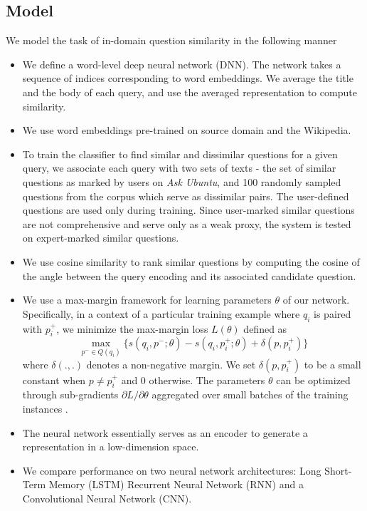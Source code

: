 \documentclass{sigkddExp}
\begin{document}
\subsection{Model}
We model the task of in-domain question similarity in the following manner
\begin{itemize}[topsep=0pt,itemsep=-1ex,partopsep=1ex,parsep=1ex]
  \item We define a word-level deep neural network (DNN). The network takes a sequence of indices corresponding to word embeddings. We average the title and the body of each query, and use the averaged representation to compute similarity.
  \item We use word embeddings pre-trained on source domain and the Wikipedia.
  \item To train the classifier to find similar and dissimilar questions for a given query, we associate each query with two sets of texts - the set of similar questions as marked by users on \textit{Ask Ubuntu}, and 100 randomly sampled questions from the corpus which serve as dissimilar pairs. The user-defined questions are used only during training. Since user-marked similar questions are not comprehensive and serve only as a weak proxy, the system is tested on expert-marked similar questions.
  \item We use cosine similarity to rank similar questions by computing the cosine of the angle between the query encoding and its associated candidate question.
  \item We use a max-margin framework for learning parameters $\theta$ of our network. Specifically, in a context of a particular training example where $q_i$ is paired with $p^+_i$, we minimize the max-margin loss $L(\theta)$ defined as\\
  \begin{equation}
  \max_{p^- \in Q(q_i)} \{s(q_i,p^-;\theta) - s(q_i,p^+_i;\theta) + \delta(p, p^+_i)\}
  \end{equation}
where $\delta(.,.)$ denotes a non-negative margin. We set $\delta(p, p^+_i)$ to be a small constant when $p \neq p^+_i$ and 0 otherwise. The parameters $\theta$ can be optimized through sub-gradients ${\partial L}/{\partial \theta}$ aggregated over small batches of the training instances \cite{lei2015semi}.
  \item The neural network essentially serves as an encoder to generate a representation in a low-dimension space.
  \item We compare performance on two neural network architectures: Long Short-Term Memory (LSTM) Recurrent Neural Network (RNN) and a Convolutional Neural Network (CNN).

\end{itemize}
\end{document}
